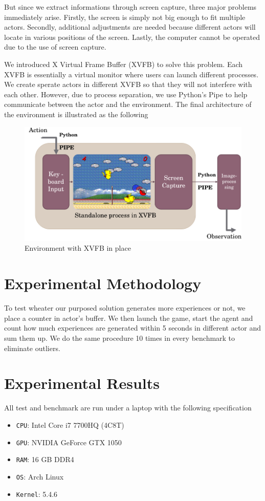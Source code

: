 \documentclass[sigconf]{acmart}
\begin{document}
But since we extract informations through screen capture, three major problems immediately arise. Firstly, the screen is simply not big enough to fit multiple actors. Secondly, additional adjustments are needed because different actors will locate in various positions of the screen. Lastly, the computer cannot be operated due to the use of screen capture.

We introduced X Virtual Frame Buffer (XVFB) to solve this problem. Each XVFB is essentially a virtual monitor where users can launch different processes. We create sperate actors in different XVFB so that they will not interfere with each other. However, due to process separation, we use Python's Pipe to help communicate between the actor and the environment. The final architecture of the environment is illustrated as the following
\begin{figure}[h]
  \centering
  \includegraphics[width=\columnwidth]{xvfb.png}
  \caption{Environment with XVFB in place}
\end{figure}

\section{Experimental Methodology}
To test wheater our purposed solution generates more experiences or not, we place a counter in actor's buffer. We then launch the game, start the agent and count how much experiences are generated within 5 seconds in different actor and sum them up. We do the same procedure 10 times in every benchmark to eliminate outliers.

\section{Experimental Results}
All test and benchmark are run under a laptop with the following specification
\begin{itemize}
\item {\verb|CPU|}: Intel Core i7 7700HQ (4C8T)
\item {\verb|GPU|}: NVIDIA GeForce GTX 1050
\item {\verb|RAM|}: 16 GB DDR4
\item {\verb|OS|}: Arch Linux
\item {\verb|Kernel|}: 5.4.6
\end{itemize}
\end{document}
